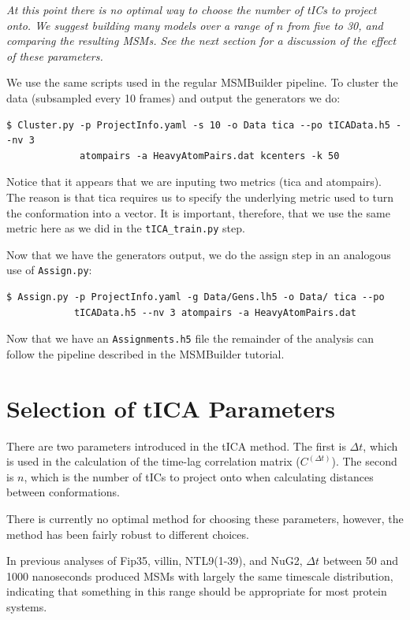 \documentclass[12pt]{article}
\begin{document}
{\it At this point there is no optimal way to choose the number of tICs to project onto. We suggest building many models over a range of $n$ from five to 30, and comparing the resulting MSMs. See the next section for a discussion of the effect of these parameters.}

We use the same scripts used in the regular MSMBuilder pipeline. To cluster the data (subsampled every 10 frames) and output the generators we do:
\begin{verbatim}
$ Cluster.py -p ProjectInfo.yaml -s 10 -o Data tica --po tICAData.h5 --nv 3 
             atompairs -a HeavyAtomPairs.dat kcenters -k 50
\end{verbatim} Notice that it appears that we are inputing two metrics (tica and atompairs). The reason is that tica requires us to specify the underlying metric used to turn the conformation into a vector. It is important, therefore, that we use the same metric here as we did in the \texttt{tICA\_train.py} step.

Now that we have the generators output, we do the assign step in an analogous use of \texttt{Assign.py}:
\begin{verbatim}
$ Assign.py -p ProjectInfo.yaml -g Data/Gens.lh5 -o Data/ tica --po 
            tICAData.h5 --nv 3 atompairs -a HeavyAtomPairs.dat
\end{verbatim} 

Now that we have an \texttt{Assignments.h5} file the remainder of the analysis can follow the pipeline described in the MSMBuilder tutorial.

\section{Selection of tICA Parameters}

There are two parameters introduced in the tICA method. The first is $\Delta t$, which is used in the calculation of the time-lag correlation matrix ($C^{(\Delta t)}$). The second is $n$, which is the number of tICs to project onto when calculating distances between conformations. 

There is currently no optimal method for choosing these parameters, however, the method has been fairly robust to different choices. 

In previous analyses of Fip35, villin, NTL9(1-39), and NuG2, $\Delta t$ between 50 and 1000 nanoseconds produced MSMs with largely the same timescale distribution, indicating that something in this range should be appropriate for most protein systems.
\end{document}
